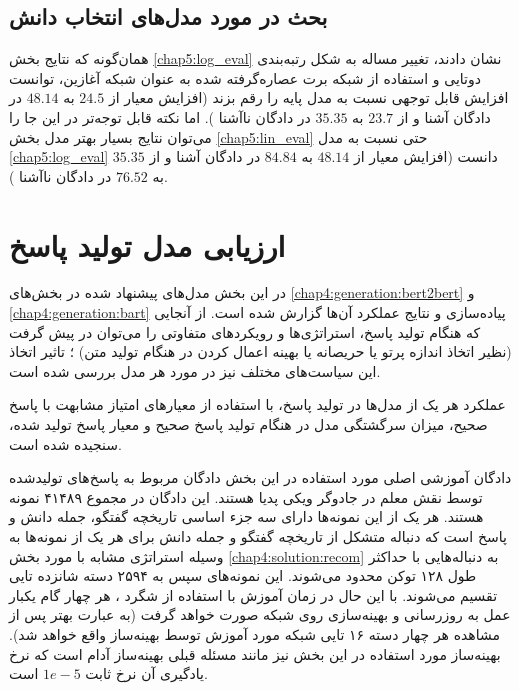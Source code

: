 \subsection{بحث در مورد مدل‌های انتخاب دانش}

همان‌گونه که نتایج بخش 
\ref{chap5:log_eval}
نشان دادند، تغییر مساله به شکل رتبه‌بندی دوتایی و استفاده از شبکه برت عصاره‌گرفته شده به عنوان شبکه آغازین،‌ توانست افزایش قابل توجهی نسبت به مدل پایه را رقم بزند (افزایش معیار
از 
$24.5$
 به 
$48.14$
  در دادگان آشنا و از 
$23.7$
   به 
$35.35$
    در دادگان ناآشنا
).
اما نکته قابل توجه‌تر در این جا را می‌توان نتایج بسیار بهتر مدل بخش
\ref{chap5:lin_eval}
حتی نسبت به مدل 
\ref{chap5:log_eval}
دانست (افزایش معیار
از 
$48.14$
 به 
$84.84$
  در دادگان آشنا و از 
$35.35$
   به 
$76.52$
    در دادگان ناآشنا
).

\section{ارزیابی مدل تولید پاسخ}

در این بخش مدل‌های پیشنهاد شده در بخش‌های 
\ref{chap4:generation:bert2bert}
و
\ref{chap4:generation:bart}
پیاده‌سازی و نتایج عملکرد آن‌ها گزارش شده است. از آنجایی که هنگام تولید پاسخ، استراتژی‌ها و رویکرد‌های متفاوتی را می‌توان در پیش گرفت (نظیر اتخاذ اندازه پرتو یا حریصانه یا بهینه اعمال کردن در هنگام تولید متن) ؛ تاثیر اتخاذ این سیاست‌های مختلف نیز در مورد هر مدل بررسی شده است.

عملکرد هر یک از مدل‌ها در تولید پاسخ، با استفاده از معیار‌های امتیاز مشابهت
با پاسخ صحیح، میزان سرگشتگی مدل در هنگام تولید پاسخ صحیح و معیار
پاسخ تولید شده، سنجیده شده است.

دادگان آموزشی اصلی مورد استفاده در این بخش دادگان  مربوط به پاسخ‌های تولیدشده توسط نقش معلم در جادوگر ویکی پدیا هستند. این دادگان در مجموع ۴۱۴۸۹ نمونه هستند. هر یک از این نمونه‌ها دارای سه جزء اساسی تاریخچه گفتگو، جمله دانش و پاسخ است که دنباله متشکل از تاریخچه گفتگو و جمله دانش برای هر یک از نمونه‌ها به وسیله استراتژی مشابه با مورد بخش
\ref{chap4:solution:recom}
به دنباله‌هایی با حداکثر طول ۱۲۸ توکن محدود می‌شوند. این نمونه‌های سپس به ۲۵۹۴ دسته شانزده تایی تقسیم می‌شوند. با این حال در زمان آموزش با استفاده از شگرد 
، هر چهار گام یکبار عمل به روزرسانی و بهینه‌سازی روی شبکه صورت خواهد گرفت (به عبارت بهتر پس از مشاهده هر چهار دسته ۱۶ تایی شبکه مورد آموزش توسط بهینه‌ساز واقع خواهد شد). بهینه‌ساز مورد استفاده در این بخش نیز مانند مسئله قبلی بهینه‌ساز آدام است که نرخ یادگیری آن نرخ ثابت 
$1e-5$
است. 

